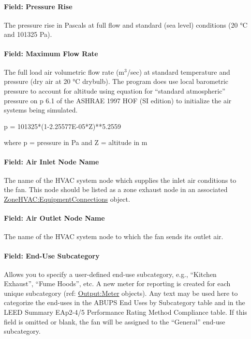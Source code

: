 \paragraph{Field: Pressure Rise}\label{field-pressure-rise-3}

The pressure rise in Pascals at full flow and standard (sea level) conditions (20 °C and 101325 Pa).

\paragraph{Field: Maximum Flow Rate}\label{field-maximum-flow-rate-3}

The full load air volumetric flow rate (m\(^{3}\)/sec) at standard temperature and pressure (dry air at 20 °C drybulb). The program does use local barometric pressure to account for altitude using equation for ``standard atmospheric'' pressure on p 6.1 of the ASHRAE 1997 HOF (SI edition) to initialize the air systems being simulated.

p = 101325*(1-2.25577E-05*Z)**5.2559

where p = pressure in Pa and Z = altitude in m

\paragraph{Field: Air Inlet Node Name}\label{field-air-inlet-node-name-3-000}

The name of the HVAC system node which supplies the inlet air conditions to the fan. This node should be listed as a zone exhaust node in an associated \hyperref[zonehvacequipmentconnections]{ZoneHVAC:EquipmentConnections} object.

\paragraph{Field: Air Outlet Node Name}\label{field-air-outlet-node-name-3-000}

The name of the HVAC system node to which the fan sends its outlet air.

\paragraph{Field: End-Use Subcategory}\label{field-end-use-subcategory-3}

Allows you to specify a user-defined end-use subcategory, e.g., ``Kitchen Exhaust'', ``Fume Hoods'', etc. A new meter for reporting is created for each unique subcategory (ref: \hyperref[outputmeter-and-outputmetermeterfileonly]{Output:Meter} objects). Any text may be used here to categorize the end-uses in the ABUPS End Uses by Subcategory table and in the LEED Summary EAp2-4/5 Performance Rating Method Compliance table. If this field is omitted or blank, the fan will be assigned to the ``General'' end-use subcategory.

